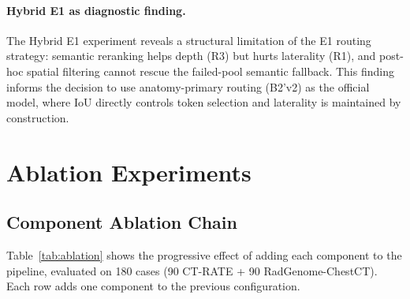 \documentclass[11pt,a4paper]{article}
\begin{document}
\paragraph{Hybrid E1 as diagnostic finding.}
The Hybrid E1 experiment reveals a structural limitation of the E1 routing strategy: semantic reranking helps depth (R3) but hurts laterality (R1), and post-hoc spatial filtering cannot rescue the failed-pool semantic fallback.
This finding informs the decision to use anatomy-primary routing (B2'v2) as the official model, where IoU directly controls token selection and laterality is maintained by construction.



\section{Ablation Experiments}
\label{sec:ablations}

\subsection{Component Ablation Chain}

Table~\ref{tab:ablation} shows the progressive effect of adding each component to the pipeline, evaluated on 180 cases (90 CT-RATE + 90 RadGenome-ChestCT).
Each row adds one component to the previous configuration.
\end{document}
